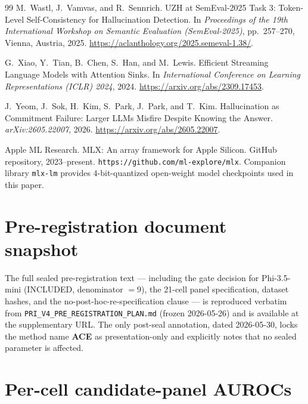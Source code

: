 \documentclass[10pt, letterpaper]{article}
\begin{document}
\begin{thebibliography}{99}
M.~Wastl, J.~Vamvas, and R.~Sennrich.
\newblock UZH at SemEval-2025 Task 3: Token-Level Self-Consistency
for Hallucination Detection.
\newblock In \emph{Proceedings of the 19th International Workshop on
Semantic Evaluation (SemEval-2025)}, pp.~257--270, Vienna, Austria,
2025.
\newblock \url{https://aclanthology.org/2025.semeval-1.38/}.

G.~Xiao, Y.~Tian, B.~Chen, S.~Han, and M.~Lewis.
\newblock Efficient Streaming Language Models with Attention Sinks.
\newblock In \emph{International Conference on Learning
Representations (ICLR) 2024}, 2024.
\newblock \url{https://arxiv.org/abs/2309.17453}.

J.~Yeom, J.~Sok, H.~Kim, S.~Park, J.~Park, and T.~Kim.
\newblock Hallucination as Commitment Failure: Larger LLMs Misfire
Despite Knowing the Answer.
\newblock \emph{arXiv:2605.22007}, 2026.
\newblock \url{https://arxiv.org/abs/2605.22007}.

Apple ML Research.
\newblock MLX: An array framework for Apple Silicon.
\newblock GitHub repository, 2023--present.
\newblock \texttt{https://github.com/ml-explore/mlx}. Companion library
\texttt{mlx-lm} provides 4-bit-quantized open-weight model checkpoints
used in this paper.

\end{thebibliography}

\appendix

\section{Pre-registration document snapshot}
\label{app:prereg}

The full sealed pre-registration text --- including the gate decision
for Phi-3.5-mini (INCLUDED, denominator $= 9$), the 21-cell panel
specification, dataset hashes, and the no-post-hoc-re-specification
clause --- is reproduced verbatim from
\texttt{PRI\_V4\_PRE\_REGISTRATION\_PLAN.md} (frozen 2026-05-26) and
is available at the supplementary URL. The only post-seal annotation,
dated 2026-05-30, locks the method name \textbf{ACE} as
presentation-only and explicitly notes that no sealed parameter is
affected.

\section{Per-cell candidate-panel AUROCs}
\label{app:panel}
\end{document}
